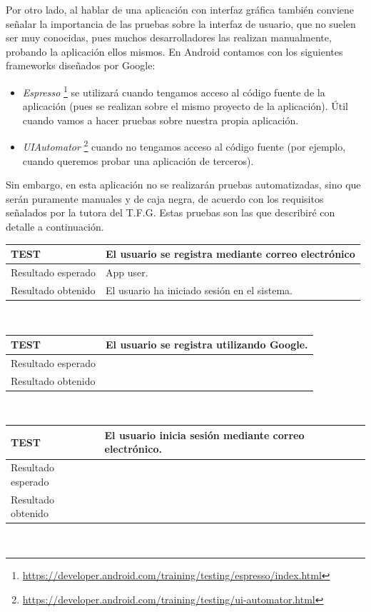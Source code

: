 \documentclass[twoside]{report}
\newcommand\addrow[2]{#1 &#2\\ }
\newcommand\addheading[2]{#1 &#2\\ \hline}
\newcommand\tabularhead{\begin{tabular}{lp{0.7\textwidth}}
\hline
}
\newenvironment{test}{\tabularhead}
{\hline\end{tabular}}
\begin{document}
Por otro lado, al hablar de una aplicación con interfaz gráfica también conviene señalar la importancia de las pruebas sobre la interfaz de usuario, que no suelen ser muy conocidas, pues muchos desarrolladores las realizan manualmente, probando la aplicación ellos mismos. En Android contamos con los siguientes frameworks diseñados por Google:

\begin{itemize}
\item \textit{Espresso} \footnote{\url{https://developer.android.com/training/testing/espresso/index.html}} se utilizará cuando tengamos acceso al código fuente de la aplicación (pues se realizan sobre el mismo proyecto de la aplicación). Útil cuando vamos a hacer pruebas sobre nuestra propia aplicación.

\item \textit{UIAutomator} \footnote{\url{https://developer.android.com/training/testing/ui-automator.html}} cuando no tengamos acceso al código fuente (por ejemplo, cuando queremos probar una aplicación de terceros).

\end{itemize}


Sin embargo, en esta aplicación no se realizarán pruebas automatizadas, sino que serán puramente manuales y de caja negra, de acuerdo con los requisitos señalados por la tutora del T.F.G. Estas pruebas son las que describiré con detalle a continuación.

\vspace{1cm}

\begin{test}
  \addheading{\textbf{TEST\arabic{test}}}{El usuario se registra mediante correo electrónico} 
  \addrow{Resultado esperado}{App user.}
  \addrow{Resultado obtenido}{El usuario ha iniciado sesión en el sistema.}
\end{test}\\

\vspace{0.5cm}

\begin{test}
  \addheading{\textbf{TEST\arabic{test}}}{El usuario se registra utilizando Google.} 
  \addrow{Resultado esperado}{}
  \addrow{Resultado obtenido}{}
\end{test}\\

\vspace{0.5cm}

\begin{test}
  \addheading{\textbf{TEST\arabic{test}}}{El usuario inicia sesión mediante correo electrónico.} 
  \addrow{Resultado esperado}{}
  \addrow{Resultado obtenido}{}
\end{test}\\
\end{document}
